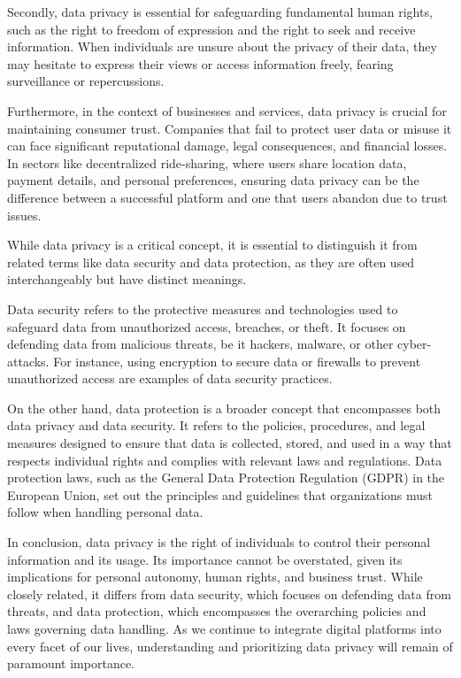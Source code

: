 Secondly, data privacy is essential for safeguarding fundamental human rights, such as the right to freedom of expression and the right to seek and receive information. When individuals are unsure about the privacy of their data, they may hesitate to express their views or access information freely, fearing surveillance or repercussions.

Furthermore, in the context of businesses and services, data privacy is crucial for maintaining consumer trust. Companies that fail to protect user data or misuse it can face significant reputational damage, legal consequences, and financial losses. In sectors like decentralized ride-sharing, where users share location data, payment details, and personal preferences, ensuring data privacy can be the difference between a successful platform and one that users abandon due to trust issues.

While data privacy is a critical concept, it is essential to distinguish it from related terms like data security and data protection, as they are often used interchangeably but have distinct meanings.

Data security refers to the protective measures and technologies used to safeguard data from unauthorized access, breaches, or theft. It focuses on defending data from malicious threats, be it hackers, malware, or other cyber-attacks. For instance, using encryption to secure data or firewalls to prevent unauthorized access are examples of data security practices.

On the other hand, data protection is a broader concept that encompasses both data privacy and data security. It refers to the policies, procedures, and legal measures designed to ensure that data is collected, stored, and used in a way that respects individual rights and complies with relevant laws and regulations. Data protection laws, such as the General Data Protection Regulation (GDPR) in the European Union, set out the principles and guidelines that organizations must follow when handling personal data.

In conclusion, data privacy is the right of individuals to control their personal information and its usage. Its importance cannot be overstated, given its implications for personal autonomy, human rights, and business trust. While closely related, it differs from data security, which focuses on defending data from threats, and data protection, which encompasses the overarching policies and laws governing data handling. As we continue to integrate digital platforms into every facet of our lives, understanding and prioritizing data privacy will remain of paramount importance.

